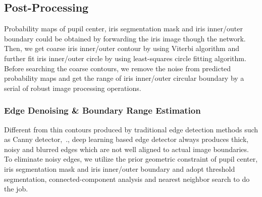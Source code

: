 \documentclass[journal]{IEEEtran}
\begin{document}
\subsection{Post-Processing}
\label{sec::post-processing}
Probability maps of pupil center, iris segmentation mask and iris inner/outer boundary could be obtained by forwarding the iris image though the network. Then, we get coarse iris inner/outer contour by using Viterbi algorithm \cite{Sutra2012The} and further fit iris inner/outer circle by using least-squares circle fitting algorithm\cite{chernov2005least}. Before searching the coarse contours, we remove the noise from predicted probability maps and get the range of iris inner/outer circular boundary by a serial of robust image processing operations.

\subsubsection{Edge Denoising \& Boundary Range Estimation}
\label{sec::range}
Different from thin contours produced by traditional edge detection methods such as Canny detector\cite{canny1986computational},~\etc., deep learning based edge detector always produces thick, noisy and blurred edges which are not well aligned to actual image boundaries\cite{xie2015hed}. To eliminate noisy edges, we utilize the prior geometric constraint of pupil center, iris segmentation mask and iris inner/outer boundary and adopt threshold segmentation, connected-component analysis and nearest neighbor search to do the job.
\end{document}
